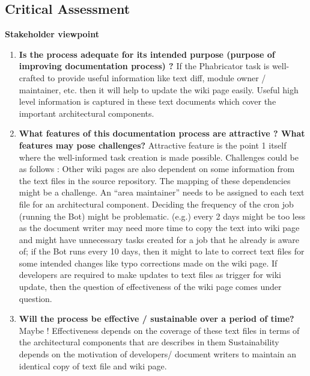 \subsection{Critical Assessment}
\textbf{Stakeholder viewpoint}
\begin{enumerate}
\item \textbf{Is the process adequate for its intended purpose (purpose of improving documentation process) ?}
\newline If the Phabricator task is well-crafted to provide useful information like text diff, module owner / maintainer, etc. then it will help to update the wiki page easily. 
\newline Useful high level information is captured in these text documents which cover the important architectural components.
\item \textbf{What features of this documentation process are attractive ? What features may pose challenges?}
\newline Attractive feature is the point 1 itself where the well-informed task creation is made possible.
Challenges could be as follows :
\newline Other wiki pages are also dependent on some information from the text files in the source repository. The mapping of these dependencies might be a challenge.
\newline An \enquote{area maintainer} needs to be assigned to each text file for an architectural component.
\newline Deciding the frequency of the cron job (running the Bot) might be problematic. (e.g.) every 2 days might be too less as the document writer may need more time to copy the text into wiki page and might have unnecessary tasks created for a job that he already is aware of; if the Bot runs every 10 days, then it might to late to correct text files for some intended changes like typo corrections made on the wiki page.
\newline If developers are required to make updates to text files as trigger for wiki update, then the question of effectiveness of the wiki page comes under question. 
\item \textbf{Will the process be effective / sustainable over a period of time?}
\newline Maybe ! 
\newline Effectiveness depends on the coverage of these text files in terms of the architectural components that are describes in them
\newline Sustainability depends on the motivation of developers/ document writers to maintain an identical copy of text file and wiki page.
\end{enumerate}
